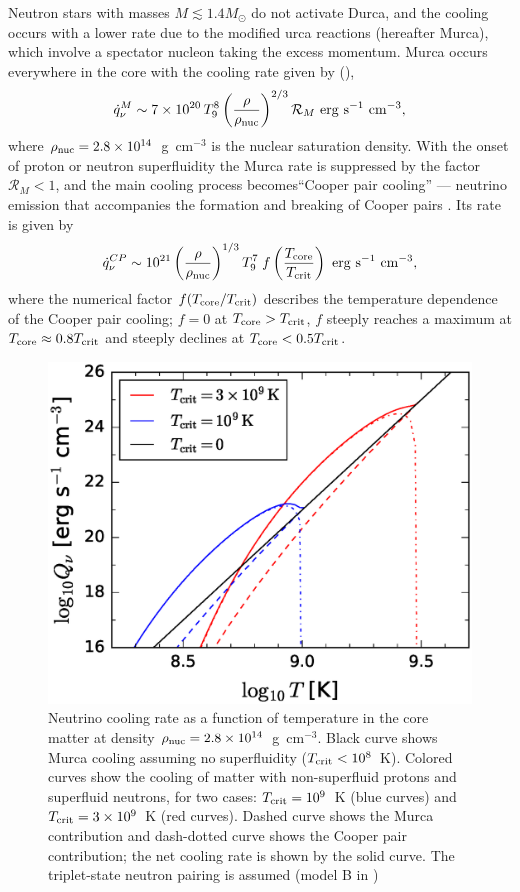 Neutron stars with masses $M\lesssim 1.4M_\odot$ do not activate Durca, and the cooling occurs with a lower rate due to the modified urca reactions (hereafter Murca), which involve a spectator nucleon taking the excess momentum.
Murca occurs everywhere in the core with the cooling rate given by 
(\citealp{1979ApJ...232..541F}),
%
\begin{equation}
	\label{eq:Murca}
  \dot{q}_{\nu}^M\sim  7\times 10^{20}
  \,T_9^8 \left(\frac{\rho}{\rho_{\rm nuc}}\right)^{2/3} \mathcal{R}_M
    {\rm ~erg~s}^{-1}{\rm ~cm}^{-3},
\end{equation}
%
where $\rho_{\rm nuc}=2.8\times 10^{14}$~g~cm$^{-3}$ is the nuclear saturation density.
With the onset of proton or neutron superfluidity the Murca rate is suppressed by the 
factor $\mathcal{R}_M<1$, and the main cooling process becomes``Cooper pair cooling'' ---  
neutrino emission that accompanies the formation and breaking of Cooper 
pairs \citep{1976ApJ...205..541F,2009ApJ...707.1131P}. Its rate is given by
%
\begin{equation}
   \dot{q}_\nu^{CP}\sim 10^{21} \left(\frac{\rho}{\rho_{\rm nuc}}\right)^{1/3} T_9^7 
    \; f\left(\frac{T_{\rm core}}{T_{\rm crit}}\right) {\rm ~erg~s}^{-1}{\rm ~cm}^{-3}, 
\end{equation}
%
where the numerical factor $f(T_{\rm core}/T_{\rm crit})$ describes the temperature dependence of the Cooper pair cooling; $f=0$ at $T_{\rm core}>T_{\rm crit}$, $f$ steeply reaches a maximum at $T_{\rm core}\approx 0.8 T_{\rm crit}$ and steeply declines at $T_{\rm core}<0.5 T_{\rm crit}$.
%
\begin{figure}[h]
  \centering
  \includegraphics[height=0.6\textwidth]{pics/intro/qv.eps}
  \caption[Neutrino cooling rate in the core of neutron stars] {Neutrino cooling rate as a function of temperature in the core matter at density $\rho_{\rm nuc}=2.8\times 10^{14}$~g~cm$^{-3}$. Black curve shows Murca cooling assuming no superfluidity ($T_{\rm crit}<10^8$~K). Colored curves show the cooling of matter with non-superfluid protons and superfluid neutrons, for two cases: $T_{\rm crit}=10^9$~K (blue curves) and $T_{\rm crit}=3\times 10^9$~K (red curves). Dashed curve shows the Murca contribution and dash-dotted curve shows the Cooper pair contribution; the net cooling rate is shown by the solid curve.
The triplet-state neutron pairing is assumed (model B in \citealp{2001PhR...354....1Y})}
  \label{fig:NS-qv}
\end{figure}
%

